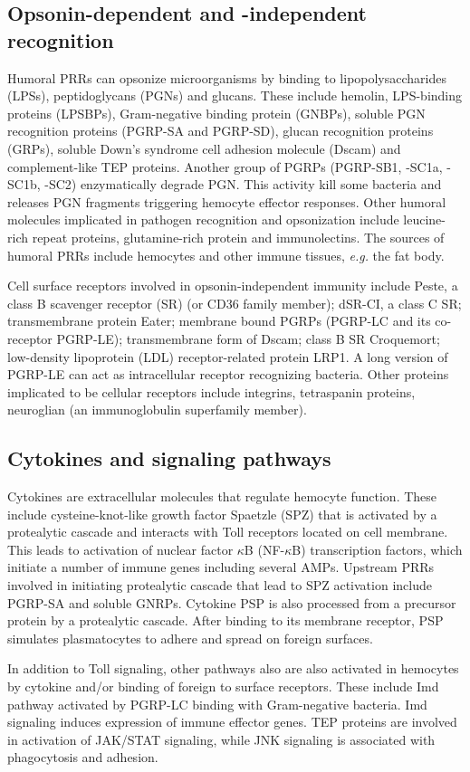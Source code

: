 \documentclass[11pt]{article}
\begin{document}
\subsection{Opsonin-dependent and -independent recognition}
Humoral PRRs can opsonize microorganisms by binding to lipopolysaccharides (LPSs), peptidoglycans (PGNs) and glucans. 
These include 
hemolin, 
LPS-binding proteins (LPSBPs), 
Gram-negative binding protein (GNBPs), 
soluble PGN recognition proteins (PGRP-SA and PGRP-SD), 
glucan recognition proteins (GRPs), 
soluble Down's syndrome cell adhesion molecule (Dscam) 
and complement-like TEP proteins. 
Another group of PGRPs (PGRP-SB1, -SC1a, -SC1b, -SC2) enzymatically degrade PGN. 
This activity kill some bacteria and releases PGN fragments triggering hemocyte effector responses. 
Other humoral molecules implicated in pathogen recognition and opsonization include 
leucine-rich repeat proteins, 
glutamine-rich protein 
and immunolectins. 
The sources of humoral PRRs include hemocytes and other immune tissues, \textit{e.g.} the fat body. 

\newline

Cell surface receptors involved in opsonin-independent immunity include 
Peste, a class B scavenger receptor (SR) (or CD36 family member); 
dSR-CI, a class C SR; 
transmembrane protein Eater; 
membrane bound PGRPs (PGRP-LC and its co-receptor PGRP-LE); 
transmembrane form of Dscam; 
class B SR Croquemort; 
low-density lipoprotein (LDL) receptor-related protein LRP1. 
A long version of PGRP-LE can act as intracellular receptor recognizing bacteria. 
Other proteins implicated to be cellular receptors include 
integrins, 
tetraspanin proteins, 
neuroglian (an immunoglobulin superfamily member).

\subsection{Cytokines and signaling pathways}
Cytokines are extracellular molecules that regulate hemocyte function. 
These include cysteine-knot-like growth factor Spaetzle (SPZ) that is activated by a protealytic cascade and interacts with Toll receptors located on cell membrane. 
This leads to activation of nuclear factor $\kappa$B (NF-$\kappa$B) transcription factors, which initiate a number of immune genes including several AMPs. 
Upstream PRRs involved in initiating protealytic cascade that lead to SPZ activation include PGRP-SA and soluble GNRPs. 
Cytokine PSP is also processed from a precursor protein by a protealytic cascade. 
After binding to its membrane receptor, PSP simulates plasmatocytes to adhere and spread on foreign surfaces.

\newline

In addition to Toll signaling, other pathways also are also activated in hemocytes by cytokine and/or binding of foreign to surface receptors. 
These include Imd pathway activated by PGRP-LC binding with Gram-negative bacteria. 
Imd signaling induces expression of immune effector genes. 
TEP proteins are involved in activation of JAK/STAT signaling, while JNK signaling is associated with phagocytosis and adhesion. 
\end{document}
